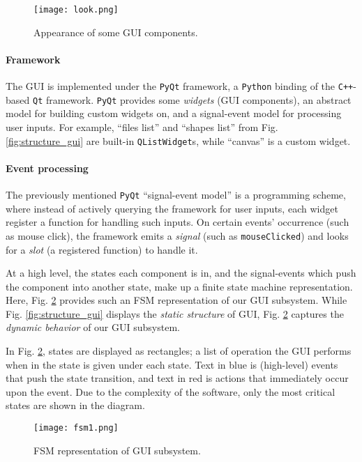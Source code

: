 \begin{figure}[htbp!]
    \centering
    \texttt{[image: look.png]}
    \caption{Appearance of some GUI components.}
    \label{fig:look_gui}
\end{figure}

\paragraph{Framework} The GUI is implemented under the \texttt{PyQt} framework,
a \texttt{Python} binding of the \texttt{C++}-based \texttt{Qt} framework.
\texttt{PyQt} provides some \textit{widgets} (GUI components), an abstract
model for building custom widgets on, and a signal-event model for processing
user inputs. For example, ``files list'' and ``shapes list'' from Fig.
\ref{fig:structure_gui} are built-in \texttt{QListWidget}s, while ``canvas'' is
a custom widget.

\paragraph{Event processing} The previously mentioned \texttt{PyQt}
``signal-event model'' is a programming scheme, where instead of actively
querying the framework for user inputs, each widget register a function for
handling such inputs. On certain events' occurrence (such as mouse click), the
framework emits a \textit{signal} (such as \texttt{mouseClicked}) and looks for
a \textit{slot} (a registered function) to handle it.

At a high level, the states each component is in, and the signal-events which
push the component into another state, make up a finite state machine
representation. Here, Fig. \ref{fig:fsm_gui} provides such an FSM
representation of our GUI subsystem. While Fig. \ref{fig:structure_gui}
displays the \textit{static structure} of GUI, Fig. \ref{fig:fsm_gui} captures
the \textit{dynamic behavior} of our GUI subsystem.

In Fig. \ref{fig:fsm_gui}, states are displayed as rectangles; a list of
operation the GUI performs when in the state is given under each state. Text in
blue is (high-level) events that push the state transition, and text in red is
actions that immediately occur upon the event. Due to the complexity of the
software, only the most critical states are shown in the diagram.

\begin{figure}[htbp!]
    \centering
    \texttt{[image: fsm1.png]}
    \caption{FSM representation of GUI subsystem.}
    \label{fig:fsm_gui}
\end{figure}

